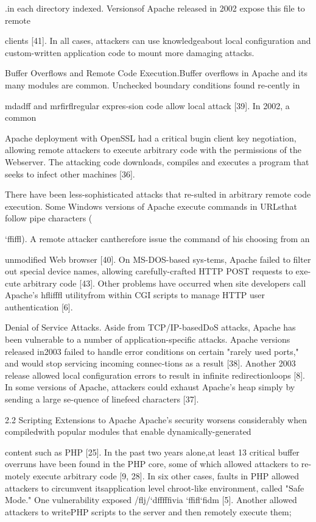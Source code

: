 .\Lambda \Xi \Pi \Sigma \Upsilon \Delta \Phi \Psi  in each directory indexed. Versionsof Apache released in 2002 expose this file to remote

clients [41]. In all cases, attackers can use knowledgeabout local configuration and custom-written application
code to mount more damaging attacks.

Buffer Overflows and Remote Code Execution.Buffer overflows in Apache and its many modules are
common. Unchecked boundary conditions found re-cently in

m\Gamma \Delta  da\Omega dff and m\Gamma \Delta  r\Phi fir\Omega fl\Phi  regular expres-sion code allow local attack [39]. In 2002, a common

Apache deployment with OpenSSL had a critical bugin client key negotiation, allowing remote attackers to
execute arbitrary code with the permissions of the Webserver. The attacking code downloads, compiles and executes a program that seeks to infect other machines [36].

There have been less-sophisticated attacks that re-sulted in arbitrary remote code execution. Some Windows versions of Apache execute commands in URLsthat follow pipe characters (

`ffiffl). A remote attacker cantherefore issue the command of his choosing from an

unmodified Web browser [40]. On MS-DOS-based sys-tems, Apache failed to filter out special device names,
allowing carefully-crafted HTTP POST requests to exe-cute arbitrary code [43]. Other problems have occurred
when site developers call Apache's hfl\Delta \Omega i\Phi fffl utilityfrom within CGI scripts to manage HTTP user authentication [6].

Denial of Service Attacks. Aside from TCP/IP-basedDoS attacks, Apache has been vulnerable to a number of
application-specific attacks. Apache versions released in2003 failed to handle error conditions on certain "rarely
used ports," and would stop servicing incoming connec-tions as a result [38]. Another 2003 release allowed local configuration errors to result in infinite redirectionloops [8]. In some versions of Apache, attackers could
exhaust Apache's heap simply by sending a large se-quence of linefeed characters [37].

2.2 Scripting Extensions to Apache
Apache's security worsens considerably when compiledwith popular modules that enable dynamically-generated

content such as PHP [25]. In the past two years alone,at least 13 critical buffer overruns have been found in
the PHP core, some of which allowed attackers to re-motely execute arbitrary code [9, 28]. In six other
cases, faults in PHP allowed attackers to circumvent itsapplication level chroot-like environment, called "Safe
Mode." One vulnerability exposed /\Phi flj/`dfffffi\Delta  via
`\Gamma ff\Omega \Psi  i\Phi fl`fi\Upsilon dm [5]. Another allowed attackers to writePHP scripts to the server and then remotely execute them;

